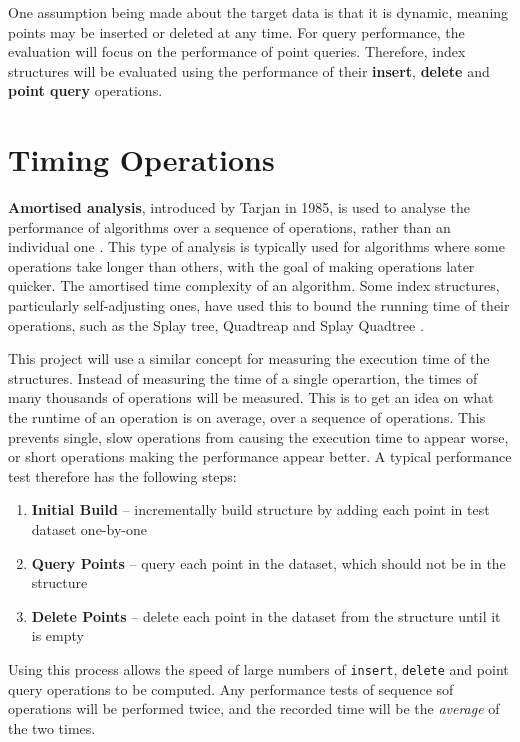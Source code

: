 One assumption being made about the target data is that it is dynamic, meaning points may be inserted or deleted at any time. For query performance, the evaluation will focus on the performance of point queries. Therefore, index structures will be evaluated using the performance of their \textbf{insert}, \textbf{delete} and \textbf{point query} operations.

\section{Timing Operations}

\textbf{Amortised analysis}, introduced by Tarjan in 1985, is used to analyse the performance of algorithms over a sequence of operations, rather than an individual one \cite{amortised-analysis}. This type of analysis is typically used for algorithms where some operations take longer than others, with the goal of making operations later quicker. The amortised time complexity of an algorithm. Some index structures, particularly self-adjusting ones, have used this to bound the running time of their operations, such as the Splay tree, Quadtreap and Splay Quadtree \cite{splay-tree, quadtreap, splay-quadtree}.

This project will use a similar concept for measuring the execution time of the structures. Instead of measuring the time of a single operartion, the times of many thousands of operations will be measured. This is to get an idea on what the runtime of an operation is on average, over a sequence of operations. This prevents single, slow operations from causing the execution time to appear worse, or short operations making the performance appear better. A typical performance test therefore has the following steps:
\begin{enumerate}
	\item \textbf{Initial Build} -- incrementally build structure by adding each point in test dataset one-by-one
	\item \textbf{Query Points} -- query each point in the dataset, which should not be in the structure
	\item \textbf{Delete Points} -- delete each point in the dataset from the structure until it is empty
\end{enumerate}
Using this process allows the speed of large numbers of \texttt{insert}, \texttt{delete} and point query operations to be computed. Any performance tests of sequence sof operations will be performed twice, and the recorded time will be the \textit{average} of the two times.

